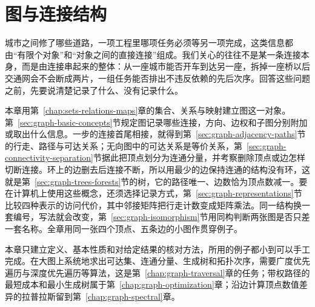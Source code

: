 \chapter{图与连接结构}
\label{chap:graph-objects}
\label{chap:graph-paths}

城市之间修了哪些道路，一项工程里哪项任务必须等另一项完成，这类信息都由“有限个对象”和“对象之间的直接连接”组成。我们关心的往往不是某一条连接本身，而是由连接串起来的整体：从一座城市能否开车到达另一座，拆掉一座桥以后交通网会不会断成两片，一组任务能否排出不违反依赖的先后次序。回答这些问题之前，先要说清楚记录了什么、没有记录什么。

本章用第~\ref{chap:sets-relations-maps}章的集合、关系与映射建立图这一对象。第~\ref{sec:graph-basic-concepts}节规定图记录哪些连接，方向、边权和子图分别附加或取出什么信息。一步的连接首尾相接，就得到第~\ref{sec:graph-adjacency-paths}节的行走、路径与可达关系；无向图中的可达关系是等价关系，第~\ref{sec:graph-connectivity-separation}节据此把顶点划分为连通分量，并考察删除顶点或边怎样切断连接。环上的边删去后连接不断，所以用最少的边保持连通的结构没有环，这就是第~\ref{sec:graph-trees-forests}节的树，它的路径唯一、边数恰为顶点数减一。要在计算机上使用这些概念，还须选择记录方式，第~\ref{sec:graph-representations}节比较四种表示的访问代价，其中邻接矩阵把行走计数变成矩阵乘法。同一结构换一套编号，写法就会改变，第~\ref{sec:graph-isomorphism}节用同构判断两张图是否只差一套名称。全章用同一张四个顶点、五条边的小图作贯穿例子。

本章只建立定义、基本性质和对给定结果的核对方法，所用的例子都小到可以手工完成。在大图上系统地求出可达集、连通分量、生成树和拓扑次序，需要广度优先遍历与深度优先遍历等算法，这是第~\ref{chap:graph-traversal}章的任务；带权路径的最短成本和最小生成树属于第~\ref{chap:graph-optimization}章；沿边计算顶点数值差异的拉普拉斯留到第~\ref{chap:graph-spectral}章。








